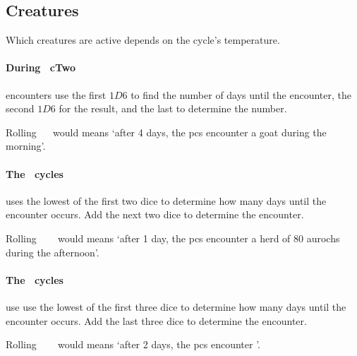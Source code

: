 \begin{multicols}{2}

\subsection{Creatures}

Which creatures are active depends on the \gls{cycle}'s temperature.

\toggletrue{genExamples}
\setcounter{enc}{19}
\begin{boxtable}[rXc]
\end{boxtable}

\setcounter{temperature}{0}
\paragraph{During \showTemperature\ \gls{cTwo}}
encounters use the first $1D6$ to find the number of days until the encounter, the second $1D6$ for the result, and the last to determine the number.

Rolling ~~ would means `after 4 days, the \glspl{pc} encounter a goat during the morning'.

\paragraph{The \showTemperature\ \glspl{cycle}}
uses the lowest of the first two dice to determine how many days until the encounter occurs.
Add the next two dice to determine the encounter.

Rolling ~~~ would means `after 1 day, the \glspl{pc} encounter a herd of 80 aurochs during the afternoon'.

\paragraph{The \showTemperature\ \glspl{cycle}}
use use the lowest of the first three dice to determine how many days until the encounter occurs.
Add the last three dice to determine the encounter.

Rolling ~~~ would means `after 2 days, the \glspl{pc} encounter '.


\end{multicols}
